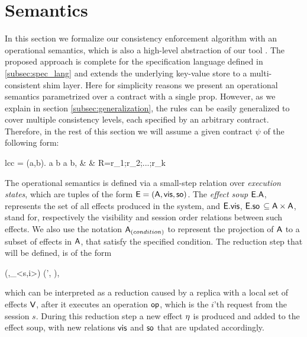 %
%
\section{Semantics}
In this section we formalize our consistency enforcement algorithm with an
operational semantics, which is also a high-level abstraction of our
tool \tool.
The proposed approach is complete for the specification language defined
in \ref{subsec:spec_lang}
and extends the underlying key-value store to a multi-consistent shim
layer. Here for simplicity reasons we present an operational semantics 
parametrized over a contract with a single prop. However, as we explain
in section \ref{subsec:generalization}, the rules can be easily
generalized to cover multiple consistency levels, each specified by an
arbitrary contract. Therefore, in the rest of this section we will assume a given contract $\psi$ of the
following form:
	\begin{smathpar}
	\begin{array}{lcc}
		\psi = \forall (a,b). a  b  \Rightarrow a
		\xrightarrow{\visZ} b, & \spc & R=r_1;r_2;...;r_k \\
	\end{array}
	\end{smathpar}

The operational semantics is defined via a small-step relation over \emph{execution
states}, which are tuples of the form ${\normalfont \textsf{E}}=({\normalfont \textsf{A}},{\normalfont \textsf{vis}} ,{\normalfont \textsf{so}})$.
The \emph{effect soup} ${\normalfont \textsf{E}}.{\normalfont \textsf{A}}$, represents the set of all
effects produced in the system, and  ${\normalfont \textsf{E}}.{\normalfont \textsf{vis}}$,
${\normalfont \textsf{E}}.{\normalfont \textsf{so}}$ $\subseteq {\normalfont \textsf{A}} \times {\normalfont \textsf{A}}$, stand for, respectively the
visibility and session order relations
between such effects. 
We also use the notation ${\normalfont \textsf{A}}_{(condition)}$
to represent the projection of ${\normalfont \textsf{A}}$ to a subset
of effects  in ${\normalfont \textsf{A}}$, that satisfy the specified condition.
The reduction step that will be defined, is of the form
\begin{smathpar}
(\E,\op_{<s,i>}) \;\xrightarrow{\V}\; (\E', \eff),
\end{smathpar}
which can be interpreted as a reduction caused by a replica with a local 
set of effects ${\normalfont \textsf{V}}$, after it executes an operation
${\normalfont \textsf{op}}$, which is the $i$'th request from the session $s$. 
During this reduction step a new effect $\eta$ is produced and added to
the effect soup, with new relations ${\normalfont \textsf{vis}}$ and ${\normalfont \textsf{so}}$ that are updated
accordingly.


